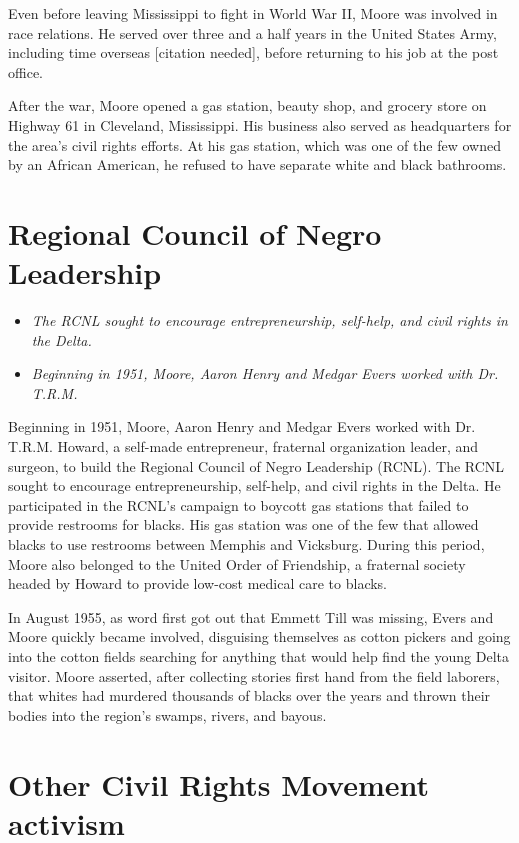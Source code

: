 Even before leaving Mississippi to fight in World War II, Moore was
involved in race relations. He served over three and a half years in the
United States Army, including time overseas {[}citation needed{]},
before returning to his job at the post office.

After the war, Moore opened a gas station, beauty shop, and grocery
store on Highway 61 in Cleveland, Mississippi. His business also served
as headquarters for the area's civil rights efforts. At his gas station,
which was one of the few owned by an African American, he refused to
have separate white and black bathrooms.

\section{Regional Council of Negro
Leadership}\label{regional-council-of-negro-leadership}

\begin{itemize}
\item
  \emph{The RCNL sought to encourage entrepreneurship, self-help, and
  civil rights in the Delta.}
\item
  \emph{Beginning in 1951, Moore, Aaron Henry and Medgar Evers worked
  with Dr. T.R.M.}
\end{itemize}

Beginning in 1951, Moore, Aaron Henry and Medgar Evers worked with Dr.
T.R.M. Howard, a self-made entrepreneur, fraternal organization leader,
and surgeon, to build the Regional Council of Negro Leadership (RCNL).
The RCNL sought to encourage entrepreneurship, self-help, and civil
rights in the Delta. He participated in the RCNL's campaign to boycott
gas stations that failed to provide restrooms for blacks. His gas
station was one of the few that allowed blacks to use restrooms between
Memphis and Vicksburg. During this period, Moore also belonged to the
United Order of Friendship, a fraternal society headed by Howard to
provide low-cost medical care to blacks.

In August 1955, as word first got out that Emmett Till was missing,
Evers and Moore quickly became involved, disguising themselves as cotton
pickers and going into the cotton fields searching for anything that
would help find the young Delta visitor. Moore asserted, after
collecting stories first hand from the field laborers, that whites had
murdered thousands of blacks over the years and thrown their bodies into
the region's swamps, rivers, and bayous.

\section{Other Civil Rights Movement
activism}\label{other-civil-rights-movement-activism}

